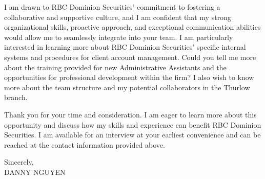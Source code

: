 \documentclass[letterpaper,11pt]{article}
\begin{document}
\vspace{10pt}

I am drawn to RBC Dominion Securities' commitment to fostering a collaborative and supportive culture, and I am confident that my strong organizational skills, proactive approach, and exceptional communication abilities would allow me to seamlessly integrate into your team.  I am particularly interested in learning more about RBC Dominion Securities' specific internal systems and procedures for client account management. Could you tell me more about the training provided for new Administrative Assistants and the opportunities for professional development within the firm?  I also wish to know more about the team structure and my potential collaborators in the Thurlow branch.


\vspace{10pt}

Thank you for your time and consideration. I am eager to learn more about this opportunity and discuss how my skills and experience can benefit RBC Dominion Securities. I am available for an interview at your earliest convenience and can be reached at the contact information provided above.


\vspace{20pt}

Sincerely, \\
\vspace{40pt}
DANNY NGUYEN
\end{document}
